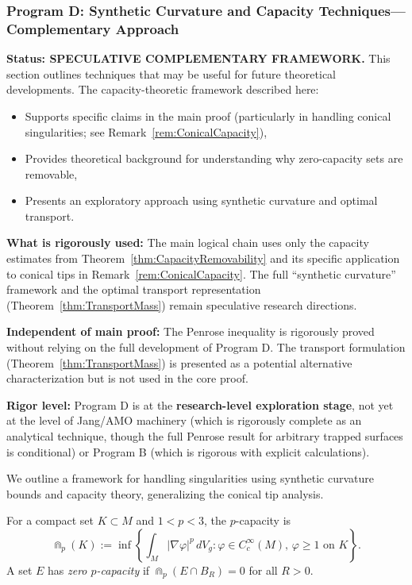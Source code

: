 \subsubsection{Program D: Synthetic Curvature and Capacity Techniques---Complementary Approach}
\label{sec:ProgramD}

\begin{remark}\label{rem:ProgramDStatus}
\textbf{Status: SPECULATIVE COMPLEMENTARY FRAMEWORK.} This section outlines techniques that may be useful for future theoretical developments. The capacity-theoretic framework described here:
\begin{itemize}
    \item Supports specific claims in the main proof (particularly in handling conical singularities; see Remark~\ref{rem:ConicalCapacity}),
    \item Provides theoretical background for understanding why zero-capacity sets are removable,
    \item Presents an exploratory approach using synthetic curvature and optimal transport.
\end{itemize}

\textbf{What is rigorously used:} The main logical chain uses only the capacity estimates from Theorem~\ref{thm:CapacityRemovability} and its specific application to conical tips in Remark~\ref{rem:ConicalCapacity}. The full ``synthetic curvature'' framework and the optimal transport representation (Theorem~\ref{thm:TransportMass}) remain speculative research directions.

\textbf{Independent of main proof:} The Penrose inequality is rigorously proved without relying on the full development of Program D. The transport formulation (Theorem~\ref{thm:TransportMass}) is presented as a potential alternative characterization but is not used in the core proof.

\textbf{Rigor level:} Program D is at the \textbf{research-level exploration stage}, not yet at the level of Jang/AMO machinery (which is rigorously complete as an analytical technique, though the full Penrose result for arbitrary trapped surfaces is conditional) or Program B (which is rigorous with explicit calculations).
\end{remark}

We outline a framework for handling singularities using synthetic curvature bounds and capacity theory, generalizing the conical tip analysis.

\begin{definition}\label{def:pCapacity}
For a compact set $K \subset M$ and $1 < p < 3$, the $p$-capacity is
\begin{equation}
    \Cap_p(K) := \inf \left\{ \int_M |\nabla \varphi|^p \, dV_g : \varphi \in C^\infty_c(M), \, \varphi \ge 1 \text{ on } K \right\}.
\end{equation}
A set $E$ has \emph{zero $p$-capacity} if $\Cap_p(E \cap B_R) = 0$ for all $R > 0$.
\end{definition}


